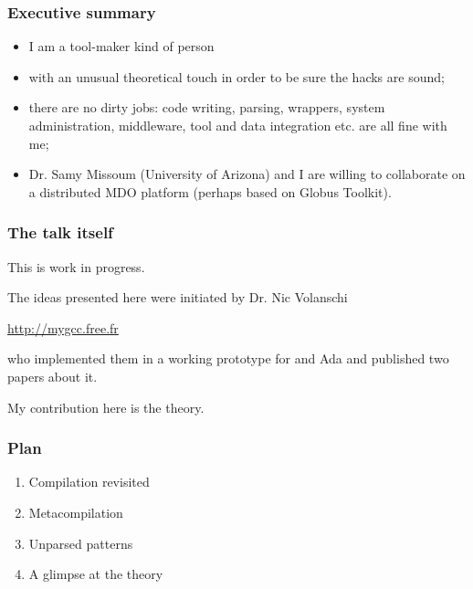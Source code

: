 \documentclass[compress,dvips,xcolor={dvipsnames},t]{beamer}
\newcommand\Ada{\textsf{Ada}\xspace}
\begin{document}
% 
\begin{frame}
\frametitle{Executive summary}


\begin{itemize}

  \item I am a tool\hyp{}maker kind of person

  \item with an unusual theoretical touch in order to be sure the
    hacks are sound;

  \item there are no dirty jobs: code writing, parsing, wrappers,
    system administration, middleware, tool and data integration
    etc. are all fine with me;

  \item Dr. Samy Missoum (University of Arizona) and I are willing to
    collaborate on a distributed MDO platform (perhaps based on Globus
    Toolkit).

\end{itemize}

\end{frame}

% 
\begin{frame}
\frametitle{The talk itself}


This is work in progress.

The ideas presented here were initiated by Dr. Nic Volanschi
\begin{center}
\url{http://mygcc.free.fr}
\end{center}
who implemented them in a working prototype for \cpp{} and \Ada and
published two papers about it.

My contribution here is the theory.

\end{frame}


% 
\begin{frame}
\frametitle{Plan}


\begin{enumerate}

  \item Compilation revisited

  \item Metacompilation

  \item Unparsed patterns

  \item A glimpse at the theory

\end{enumerate}

\end{frame}
\end{document}
